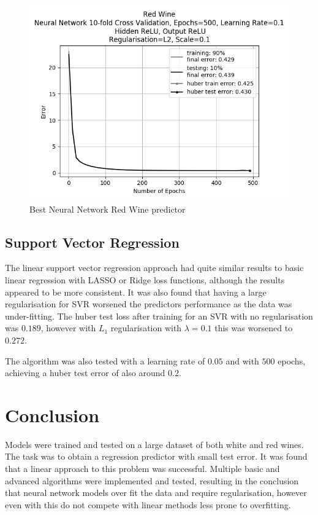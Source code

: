 \documentclass[10pt,twocolumn,letterpaper]{article}
\begin{document}
\begin{figure}[h]
	\begin{center}
		\includegraphics[width=0.9\linewidth]{img/best_red_nn.png}
	\end{center}
	\caption{Best Neural Network Red Wine predictor}
	\label{fig:rwbest}
\end{figure}

\subsection{Support Vector Regression}
The linear support vector regression approach had quite similar results to basic linear regression with LASSO or Ridge loss functions, although the results appeared to be more consistent. It was also found that having a large regularisation for SVR worsened the predictors performance as the data was under-fitting. The huber test loss after training for an SVR with no regularisation was $0.189$, however with $L_1$ regularisation with $\lambda = 0.1$ this was worsened to $0.272$.

The algorithm was also tested with a learning rate of $0.05$ and with $500$ epochs, achieving a huber test error of also around $0.2$. 

\section{Conclusion}
Models were trained and tested on a large dataset of both white and red wines. The task was to obtain a regression predictor with small test error. It was found that a linear approach to this problem was successful. Multiple basic and advanced algorithms were implemented and tested, resulting in the conclusion that neural network models over fit the data and require regularisation, however even with this do not compete with linear methods less prone to overfitting. 
\end{document}
